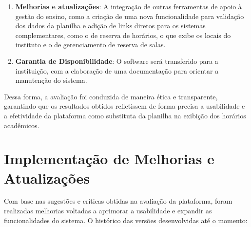 \begin{itemize}
\begin{itemize}
\begin{enumerate}
            \item \textbf{Melhorias e atualizações}: A integração de outras ferramentas de apoio à gestão do ensino, como a criação de uma nova funcionalidade para validação dos dados da planilha e adição de links diretos para os sistemas complementares, como o de reserva de horários, o que exibe os locais do instituto e o de gerenciamento de reserva de salas.
            \item \textbf{Garantia de Disponibilidade}: O software será transferido para a instituição, com a elaboração de uma documentação para orientar a manutenção do sistema.
        \end{enumerate}
    \end{itemize}
\end{itemize}

Dessa forma, a avaliação foi conduzida de maneira ética e transparente, garantindo que os resultados obtidos refletissem de forma precisa a usabilidade e a efetividade da plataforma como substituta da planilha na exibição dos horários acadêmicos.

\section{Implementação de Melhorias e Atualizações}

Com base nas sugestões e críticas obtidas na avaliação da plataforma, foram realizadas melhorias voltadas a aprimorar a usabilidade e expandir as funcionalidades do sistema. O histórico das versões desenvolvidas até o momento:

